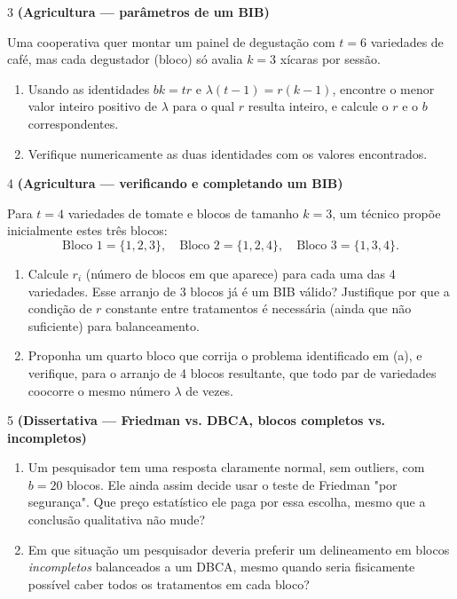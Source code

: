 \documentclass[11pt]{article}
\begin{document}
\begin{questao}{3} \textbf{(Agricultura --- parâmetros de um BIB)}

Uma cooperativa quer montar um painel de degustação com $t=6$ variedades de café, mas cada
degustador (bloco) só avalia $k=3$ xícaras por sessão.

\begin{enumerate}[label=(\alph*)]
  \item Usando as identidades $bk=tr$ e $\lambda(t-1)=r(k-1)$, encontre o menor valor inteiro
    positivo de $\lambda$ para o qual $r$ resulta inteiro, e calcule o $r$ e o $b$
    correspondentes.
  \item Verifique numericamente as duas identidades com os valores encontrados.
\end{enumerate}
\end{questao}

\begin{questao}{4} \textbf{(Agricultura --- verificando e completando um BIB)}

Para $t=4$ variedades de tomate e blocos de tamanho $k=3$, um técnico propõe inicialmente estes
três blocos:
$$
\text{Bloco 1}=\{1,2,3\}, \quad \text{Bloco 2}=\{1,2,4\}, \quad \text{Bloco 3}=\{1,3,4\}.
$$

\begin{enumerate}[label=(\alph*)]
  \item Calcule $r_i$ (número de blocos em que aparece) para cada uma das 4 variedades. Esse
    arranjo de 3 blocos já é um BIB válido? Justifique por que a condição de $r$ constante entre
    tratamentos é necessária (ainda que não suficiente) para balanceamento.
  \item Proponha um quarto bloco que corrija o problema identificado em (a), e verifique, para o
    arranjo de 4 blocos resultante, que todo par de variedades coocorre o mesmo número $\lambda$
    de vezes.
\end{enumerate}
\end{questao}

\begin{questao}{5} \textbf{(Dissertativa --- Friedman vs. DBCA, blocos completos vs. incompletos)}

\begin{enumerate}[label=(\alph*)]
  \item Um pesquisador tem uma resposta claramente normal, sem outliers, com $b=20$ blocos. Ele
    ainda assim decide usar o teste de Friedman "por segurança". Que preço estatístico ele paga
    por essa escolha, mesmo que a conclusão qualitativa não mude?
  \item Em que situação um pesquisador deveria preferir um delineamento em blocos
    \emph{incompletos} balanceados a um DBCA, mesmo quando seria fisicamente possível caber todos
    os tratamentos em cada bloco?
\end{enumerate}
\end{questao}
\end{document}
